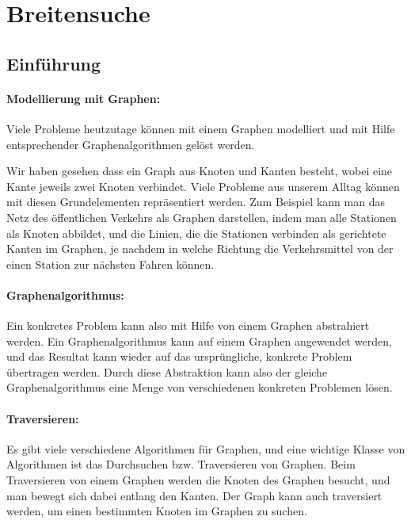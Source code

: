\section{Breitensuche}
\subsection{Einf\"uhrung}

\paragraph{Modellierung mit Graphen:}Viele Probleme heutzutage k\"onnen mit einem Graphen modelliert und mit Hilfe entsprechender Graphenalgorithmen gel\"ost werden.  

Wir haben gesehen dass ein Graph aus Knoten und Kanten besteht, wobei eine Kante jeweils zwei Knoten verbindet. Viele Probleme aus unserem Alltag k\"onnen mit diesen Grundelementen repr\"asentiert werden. Zum Beispiel kann man das Netz des \"offentlichen Verkehrs als Graphen darstellen, indem man alle Stationen als Knoten abbildet, und die Linien, die die Stationen verbinden als gerichtete Kanten im Graphen, je nachdem in welche Richtung die Verkehrsmittel von der einen Station zur n\"achsten Fahren k\"onnen.

\paragraph{Graphenalgorithmus:}Ein konkretes Problem kann also mit Hilfe von einem Graphen abstrahiert werden. Ein Graphenalgorithmus kann auf einem Graphen angewendet werden, und das Resultat kann wieder auf das urspr\"ungliche, konkrete Problem \"ubertragen werden. Durch diese Abstraktion kann also der gleiche Graphenalgorithmus eine Menge von verschiedenen konkreten Problemen l\"osen.

\paragraph{Traversieren:}Es gibt viele verschiedene Algorithmen f\"ur Graphen, und eine wichtige Klasse von Algorithmen ist das Durchsuchen bzw. Traversieren von Graphen. Beim Traversieren von einem Graphen werden die Knoten des Graphen besucht, und man bewegt sich dabei entlang den Kanten. Der Graph kann auch traversiert werden, um einen bestimmten Knoten im Graphen zu suchen.

